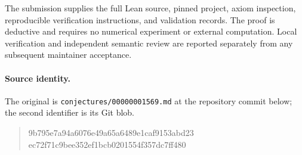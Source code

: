 \documentclass[11pt]{article}
\begin{document}
The submission supplies the full Lean source, pinned project, axiom
inspection, reproducible verification instructions, and validation
records. The proof is deductive and requires no numerical experiment or
external computation. Local verification and independent semantic review
are reported separately from any subsequent maintainer acceptance.

\paragraph{Source identity.}
The original is \texttt{conjectures/00000001569.md} at the repository commit below; the second identifier is its Git blob.
\begin{quote}\small\ttfamily
9b795e7a94a6076e49a65a6489e1caf9153abd23\\
ec72f71c9bee352ef1bcb0201554f357dc7ff480
\end{quote}
\end{document}
